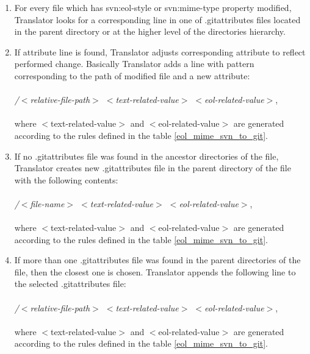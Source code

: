\begin{enumerate}
\compactlist
\item For every file which has svn:eol-style or svn:mime-type property modified, Translator looks for a corresponding line in one of .gitattributes files located in the parent directory or 
at the higher level of the directories hierarchy.\\
	
\item If attribute line is found, Translator adjusts corresponding attribute to reflect performed change. Basically Translator adds a line with pattern corresponding to the path of modified file and a new attribute:\\\\
\emph{/$<$relative-file-path$>$ $<$text-related-value$>$ $<$eol-related-value$>$},\\\\
where $<$text-related-value$>$ and $<$eol-related-value$>$ are generated according to the rules defined in the table \ref{eol_mime_svn_to_git}.\\
	
\item If no .gitattributes file was found in the ancestor directories of the file, Translator creates new .gitattributes file in the parent directory of the file with the following contents:\\\\
\emph{/$<$file-name$>$ $<$text-related-value$>$ $<$eol-related-value$>$},\\\\
where $<$text-related-value$>$ and $<$eol-related-value$>$ are generated according to the rules defined in the table \ref{eol_mime_svn_to_git}.\\
	
\item If more than one .gitattributes file was found in the parent directories of the file, then the closest one is chosen. 
Translator appends the following line to the selected .gitattributes file:\\\\
\emph{/$<$relative-file-path$>$ $<$text-related-value$>$ $<$eol-related-value$>$},\\\\
where $<$text-related-value$>$ and $<$eol-related-value$>$ are generated according to the rules defined in the table \ref{eol_mime_svn_to_git}.\\
\end{enumerate}

